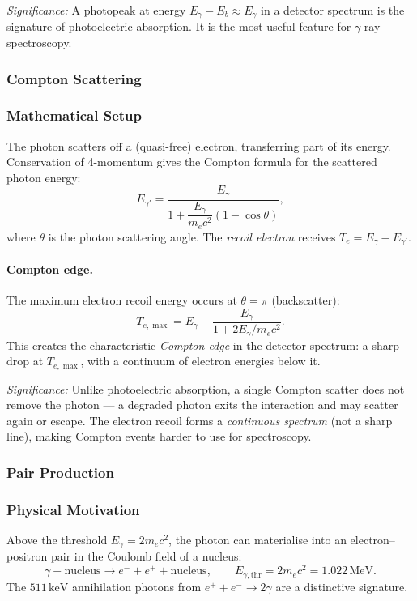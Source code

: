 \textit{Significance:} A photopeak at energy $E_\gamma - E_b \approx E_\gamma$
in a detector spectrum is the signature of photoelectric absorption.  It is the
most useful feature for $\gamma$-ray spectroscopy.

\subsubsection{Compton Scattering}
\label{subsubsec:lec06:compton}

\subsubsection*{Mathematical Setup}
The photon scatters off a (quasi-free) electron, transferring part of its energy.
Conservation of 4-momentum gives the Compton formula for the scattered photon
energy:
\begin{equation}
  \label{eq:lec06:compton}
  \boxed{E_{\gamma'} = \frac{E_\gamma}{1 + \dfrac{E_\gamma}{m_e c^2}(1-\cos\theta)},}
\end{equation}
where $\theta$ is the photon scattering angle.  The \emph{recoil electron} receives
$T_e = E_\gamma - E_{\gamma'}$.

\paragraph{Compton edge.}
The maximum electron recoil energy occurs at $\theta = \pi$ (backscatter):
\begin{equation}
  \label{eq:lec06:compton_edge}
  \boxed{T_{e,\max} = E_\gamma - \frac{E_\gamma}{1 + 2E_\gamma/m_e c^2}.}
\end{equation}
This creates the characteristic \emph{Compton edge} in the detector spectrum: a
sharp drop at $T_{e,\max}$, with a continuum of electron energies below it.

\textit{Significance:} Unlike photoelectric absorption, a single Compton scatter
does not remove the photon — a degraded photon exits the interaction and may
scatter again or escape.  The electron recoil forms a \emph{continuous spectrum}
(not a sharp line), making Compton events harder to use for spectroscopy.

\subsubsection{Pair Production}
\label{subsubsec:lec06:pair}

\subsubsection*{Physical Motivation}
Above the threshold $E_\gamma = 2m_e c^2$, the photon can materialise into an
electron–positron pair in the Coulomb field of a nucleus:
\begin{equation}
  \label{eq:lec06:pair_production}
  \boxed{\gamma + \text{nucleus} \to e^- + e^+ + \text{nucleus}, \qquad
  E_{\gamma,\text{thr}} = 2m_e c^2 = 1.022\,\text{MeV}.}
\end{equation}
The $511\,\text{keV}$ annihilation photons from $e^+ + e^- \to 2\gamma$ are a
distinctive signature.

